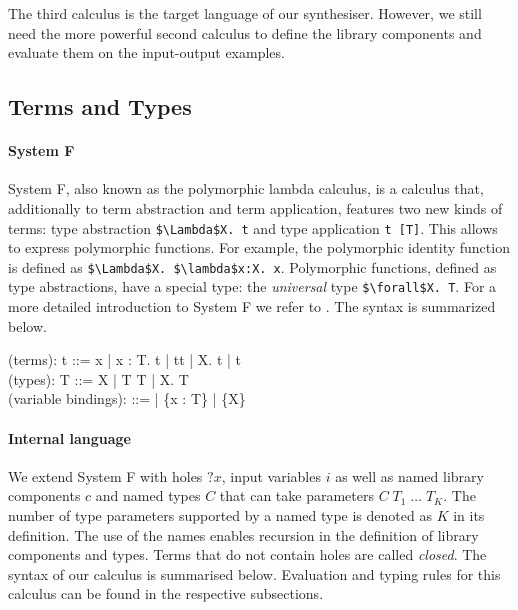 The third calculus is the target language of our synthesiser. However, we still need the more powerful second calculus to define the library components and evaluate them on the input-output examples.


  \subsection{Terms and Types}\label{Term and types}
\paragraph{System F} System F, also known as the polymorphic lambda calculus, is a calculus that, additionally to term abstraction and term application, features two new kinds of terms: type abstraction \lstinline!$\Lambda$X. t! and type application \lstinline!t [T]!. This allows to express polymorphic functions. For example, the polymorphic identity function is defined as \lstinline!$\Lambda$X. $\lambda$x:X. x!.
Polymorphic functions, defined as type abstractions, have a special type: the \emph{universal} type \lstinline!$\forall$X. T!. For a more detailed introduction to System F we refer to \cite{pierce2002types}. The syntax is summarized below.

 \begin{plstx}
(terms): t ::= x | \lambda x : T.\; t | t\;t | \Lambda X.\; t | t\;[T]\\
(types): T ::= X | T \rightarrow T | \forall X.\; T\\
(variable bindings): \Gamma ::= \emptyset | \Gamma \cup \{x : T\} | \Gamma \cup \{X\}\\
\end{plstx}


\paragraph{Internal language} We extend System F with holes $?x$, input variables $i$ as well as named library components $c$ and named types $C$ that can take parameters $C\; T_1\;\ldots\; T_K$. The number of type parameters supported by a named type is denoted as $K$ in its definition. The use of the names enables recursion in the definition of library components and types. Terms that do not contain holes are called \emph{closed}.
The syntax of our calculus is summarised below. Evaluation and typing rules for this calculus can be found in the respective subsections.

